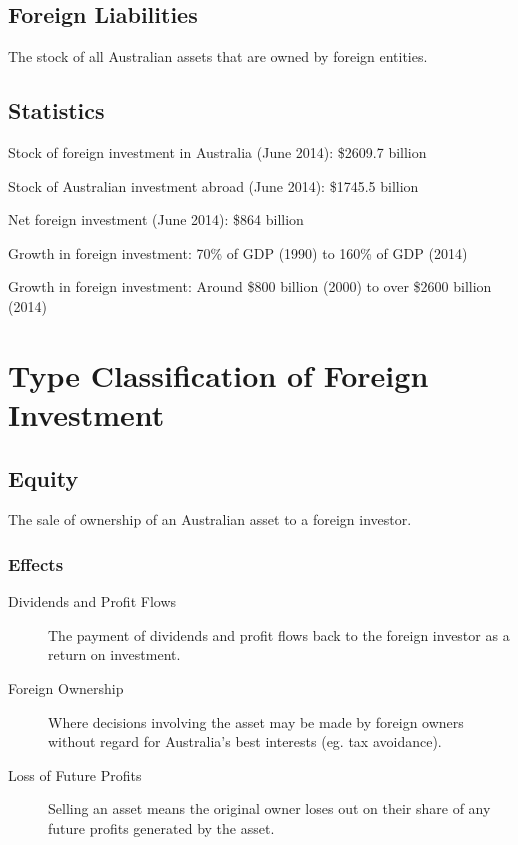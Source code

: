 \documentclass[a4paper,11pt]{report}
\begin{document}
\subsection{Foreign Liabilities}

The stock of all Australian assets that are owned by foreign entities.

\subsection{Statistics}

Stock of foreign investment in Australia (June 2014): \$2609.7 billion

Stock of Australian investment abroad (June 2014): \$1745.5 billion

Net foreign investment (June 2014): \$864 billion

Growth in foreign investment: 70\% of GDP (1990) to 160\% of GDP (2014)

Growth in foreign investment: Around \$800 billion (2000) to over \$2600
billion (2014)


\section{Type Classification of Foreign Investment}

\subsection{Equity}

The sale of ownership of an Australian asset to a foreign investor.

\subsubsection{Effects}

\begin{description}
\item [Dividends and Profit Flows] The payment of dividends and profit flows
	back to the foreign investor as a return on investment.
\item [Foreign Ownership] Where decisions involving the asset may be made by
	foreign owners without regard for Australia's best interests (eg. tax
	avoidance).
\item [Loss of Future Profits] Selling an asset means the original owner loses
	out on their share of any future profits generated by the asset.
\end{description}
\end{document}
